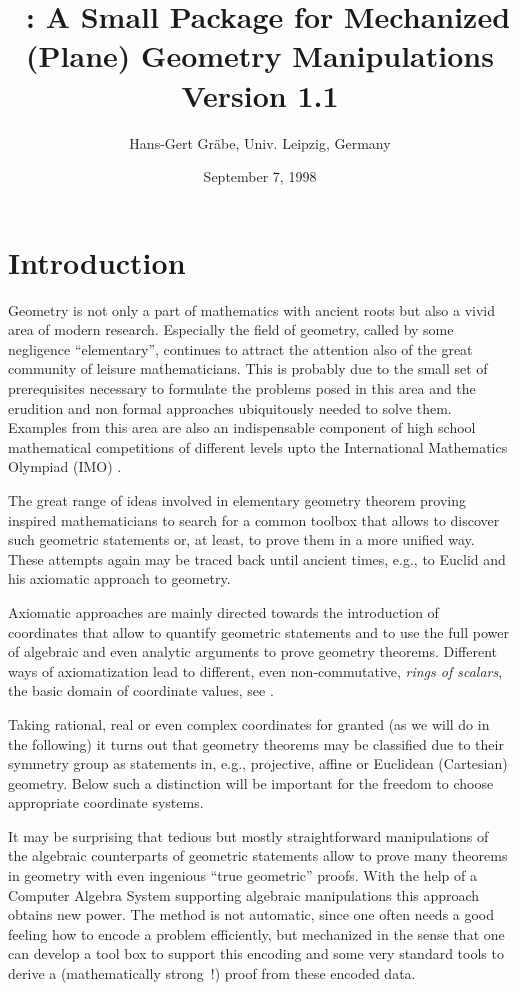 \documentclass{article}
\title{\geo\ : A Small Package for Mechanized (Plane) Geometry
Manipulations\\[20pt] Version 1.1}
\author{Hans-Gert Gr\"abe, Univ. Leipzig, Germany}
\date{September 7, 1998}
\begin{document}
\maketitle

\section{Introduction}

Geometry is not only a part of mathematics with ancient roots but also
a vivid area of modern research. Especially the field of geometry,
called by some negligence ``elementary'', continues to attract the
attention also of the great community of leisure mathematicians.  This
is probably due to the small set of prerequisites necessary to
formulate the problems posed in this area and the erudition and non
formal approaches ubiquitously needed to solve them. Examples from
this area are also an indispensable component of high school
mathematical competitions of different levels upto the International
Mathematics Olympiad (IMO) \cite{IMO}.
\medskip

The great range of ideas involved in elementary geometry theorem
proving inspired mathematicians to search for a common toolbox that
allows to discover such geometric statements or, at least, to prove
them in a more unified way. These attempts again may be traced back
until ancient times, e.g., to Euclid and his axiomatic approach to
geometry. 

Axiomatic approaches are mainly directed towards the introduction of
coordinates that allow to quantify geometric statements and to use the
full power of algebraic and even analytic arguments to prove geometry
theorems. Different ways of axiomatization lead to different, even
non-commutative, {\em rings of scalars}, the basic domain of
coordinate values, see \cite{Wu:94}.

Taking rational, real or even complex coordinates for granted (as we
will do in the following) it turns out that geometry theorems may be
classified due to their symmetry group as statements in, e.g.,
projective, affine or Euclidean (Cartesian) geometry. Below such a
distinction will be important for the freedom to choose appropriate
coordinate systems.
\medskip

It may be surprising that tedious but mostly straightforward
manipulations of the algebraic counterparts of geometric statements
allow to prove many theorems in geometry with even ingenious ``true
geometric'' proofs. With the help of a Computer Algebra System
supporting algebraic manipulations this approach obtains new power.
The method is not automatic, since one often needs a good feeling how
to encode a problem efficiently, but mechanized in the sense that one
can develop a tool box to support this encoding and some very standard
tools to derive a (mathematically strong~!) proof from these encoded
data.
\end{document}
